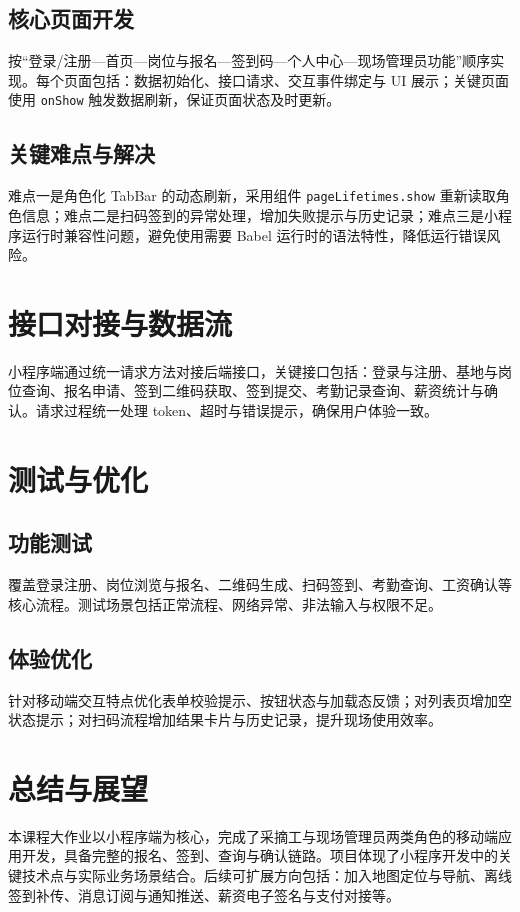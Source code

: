 ﻿\documentclass[UTF8,a4paper]{ctexart}
\begin{document}
\subsection{核心页面开发}
按“登录/注册—首页—岗位与报名—签到码—个人中心—现场管理员功能”顺序实现。每个页面包括：数据初始化、接口请求、交互事件绑定与 UI 展示；关键页面使用 \texttt{onShow} 触发数据刷新，保证页面状态及时更新。

\subsection{关键难点与解决}
难点一是角色化 TabBar 的动态刷新，采用组件 \texttt{pageLifetimes.show} 重新读取角色信息；难点二是扫码签到的异常处理，增加失败提示与历史记录；难点三是小程序运行时兼容性问题，避免使用需要 Babel 运行时的语法特性，降低运行错误风险。

\section{接口对接与数据流}
小程序端通过统一请求方法对接后端接口，关键接口包括：登录与注册、基地与岗位查询、报名申请、签到二维码获取、签到提交、考勤记录查询、薪资统计与确认。请求过程统一处理 token、超时与错误提示，确保用户体验一致。

\section{测试与优化}
\subsection{功能测试}
覆盖登录注册、岗位浏览与报名、二维码生成、扫码签到、考勤查询、工资确认等核心流程。测试场景包括正常流程、网络异常、非法输入与权限不足。

\subsection{体验优化}
针对移动端交互特点优化表单校验提示、按钮状态与加载态反馈；对列表页增加空状态提示；对扫码流程增加结果卡片与历史记录，提升现场使用效率。

\section{总结与展望}
本课程大作业以小程序端为核心，完成了采摘工与现场管理员两类角色的移动端应用开发，具备完整的报名、签到、查询与确认链路。项目体现了小程序开发中的关键技术点与实际业务场景结合。后续可扩展方向包括：加入地图定位与导航、离线签到补传、消息订阅与通知推送、薪资电子签名与支付对接等。
\end{document}
